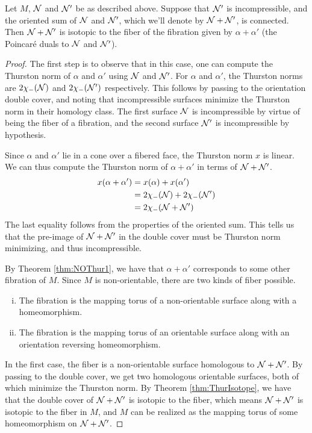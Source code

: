 \begin{thm}
  \label{thm:oriented-sum}
  Let $M$, $\mathcal{N}$ and $\mathcal{N}'$ be as described above. Suppose that $\mathcal{N}'$ is incompressible, and the
  oriented sum of $\mathcal{N}$ and $\mathcal{N}'$, which we'll denote by $\mathcal{N} + \mathcal{N}'$, is connected. Then
  $\mathcal{N} + \mathcal{N}'$ is isotopic to the fiber of the fibration given by $\alpha + \alpha'$ (the
  Poincar\'e duals to $\mathcal{N}$ and $\mathcal{N}'$).
\end{thm}
\begin{proof}
  The first step is to observe that in this case, one can compute the Thurston norm of $\alpha$ and
  $\alpha'$ using $\mathcal{N}$ and $\mathcal{N}'$. For $\alpha$ and $\alpha'$, the Thurston norms are
  $2\chi_-(\mathcal{N})$ and $2\chi_-(\mathcal{N}')$ respectively. This follows by passing to the orientation
  double cover, and noting that incompressible surfaces minimize the Thurston norm in their
  homology class. The first surface $\mathcal{N}$ is incompressible by virtue of being the fiber of a
  fibration, and the second surface $\mathcal{N}'$ is incompressible by hypothesis.

  Since $\alpha$ and $\alpha'$ lie in a cone over a fibered face, the Thurston norm $x$ is linear.
  We can thus compute the Thurston norm of $\alpha + \alpha'$ in terms of $\mathcal{N} + \mathcal{N}'$.
  \begin{align*}
    x(\alpha + \alpha') &= x(\alpha) + x(\alpha') \\
                        &= 2\chi_-(\mathcal{N}) + 2\chi_-(\mathcal{N}') \\
                        &= 2\chi_-(\mathcal{N} + \mathcal{N}')
  \end{align*}
  The last equality follows from the properties of the oriented sum. This tells us that the
  pre-image of $\mathcal{N} + \mathcal{N}'$ in the double cover must be Thurston norm minimizing, and thus
  incompressible.

  By Theorem \ref{thm:NOThur1}, we have that $\alpha + \alpha'$ corresponds to some other fibration
  of $M$. Since $M$ is non-orientable, there are two kinds of fiber possible.
  \begin{enumerate}[(i)]
  \item The fibration is the mapping torus of a non-orientable surface along with a homeomorphism.
  \item The fibration is the mapping torus of an orientable surface along with an orientation
    reversing homeomorphism.
  \end{enumerate}
  In the first case, the fiber is a non-orientable surface homologous to $\mathcal{N} + \mathcal{N}'$. By passing to the
  double cover, we get two homologous orientable surfaces, both of which minimize the Thurston norm. By
  Theorem \ref{thm:ThurIsotope}, we have that the double cover of $\mathcal{N} + \mathcal{N}'$ is isotopic to the fiber, which
  means $\mathcal{N} + \mathcal{N}'$ is isotopic to the fiber in $M$, and $M$ can be realized as the mapping torus of some
  homeomorphism on $\mathcal{N} + \mathcal{N}'$.


\end{proof}
